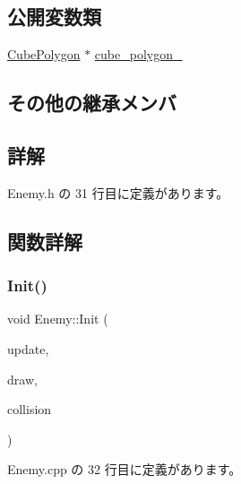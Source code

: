 \subsection*{公開変数類}
\begin{DoxyCompactItemize}
\item 
\mbox{\hyperlink{class_cube_polygon}{Cube\+Polygon}} $\ast$ \mbox{\hyperlink{class_enemy_a9a24b765d76b789cc678701886570511}{cube\+\_\+polygon\+\_\+}}
\end{DoxyCompactItemize}
\subsection*{その他の継承メンバ}


\subsection{詳解}


 Enemy.\+h の 31 行目に定義があります。



\subsection{関数詳解}
\mbox{\label{class_enemy_a678f73f8af13e1bc55be3fdad2608399}} 
\subsubsection{\texorpdfstring{Init()}{Init()}}
{\footnotesize\ttfamily void Enemy\+::\+Init (\begin{DoxyParamCaption}\item[{\mbox{\hyperlink{class_update_base}{Update\+Base}} $\ast$}]{update,  }\item[{\mbox{\hyperlink{class_draw_base}{Draw\+Base}} $\ast$}]{draw,  }\item[{\mbox{\hyperlink{class_collision_base}{Collision\+Base}} $\ast$}]{collision }\end{DoxyParamCaption})}



 Enemy.\+cpp の 32 行目に定義があります。

